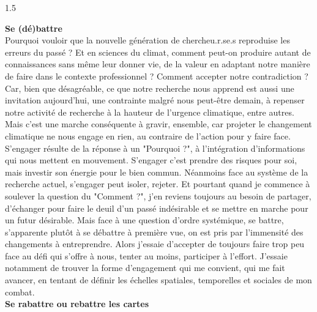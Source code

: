 \begin{spacing}{1.5}
~
\end{spacing}

{\noindent\Large\textbf{Se (dé)battre}}
\\

Pourquoi vouloir que la nouvelle génération de chercheu.r.se.s reproduise les erreurs du passé ? Et en sciences du climat, comment peut-on produire autant de connaissances sans même leur donner vie, de la valeur en adaptant notre manière de faire dans le contexte professionnel ? Comment accepter notre contradiction ? Car, bien que désagréable, ce que notre recherche nous apprend est aussi une invitation aujourd'hui, une contrainte malgré nous peut-être demain, à repenser notre activité de recherche à la hauteur de l'urgence climatique, entre autres. Mais c'est une marche conséquente à gravir, ensemble, car projeter le changement climatique ne nous engage en rien, au contraire de l'action pour y faire face. S'engager résulte de la réponse à un "Pourquoi ?", à l'intégration d'informations qui nous mettent en mouvement. S'engager c'est prendre des risques pour soi, mais investir son énergie pour le bien commun. Néanmoins face au système de la recherche actuel, s'engager peut isoler, rejeter. Et pourtant quand je commence à soulever la question du "Comment ?", j'en reviens toujours au besoin de partager, d'échanger pour faire le deuil d'un passé indésirable et se mettre en marche pour un futur désirable. Mais face à une question d'ordre systémique, se battre, s'apparente plutôt à se débattre à première vue, on est pris par l'immensité des changements à entreprendre. Alors j'essaie d'accepter de toujours faire trop peu face au défi qui s'offre à nous, tenter au moins, participer à l'effort. J'essaie notamment de trouver la forme d'engagement qui me convient, qui me fait avancer, en tentant de définir les échelles spatiales, temporelles et sociales de mon combat. 
\\


{\noindent\Large\textbf{Se rabattre ou rebattre les cartes}}
\\


